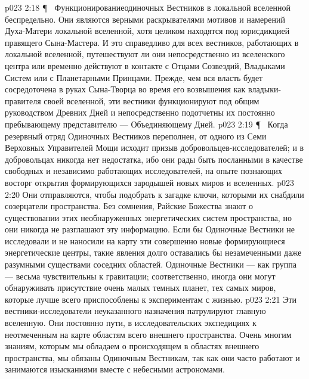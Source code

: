 \vs p023 2:18 \P\ \bibnobreakspace {} Функционированиеодиночных Вестников в локальной вселенной беспредельно. Они являются верными раскрывателями мотивов и намерений Духа\hyp{}Матери локальной вселенной, хотя целиком находятся под юрисдикцией правящего Сына\hyp{}Мастера. И это справедливо для всех вестников, работающих в локальной вселенной, путешествуют ли они непосредственно из вселенского центра или временно действуют в контакте с Отцами Созвездий, Владыками Систем или с Планетарными Принцами. Прежде, чем вся власть будет сосредоточена в руках Сына\hyp{}Творца во время его возвышения как владыки\hyp{}правителя своей вселенной, эти вестники функционируют под общим руководством Древних Дней и непосредственно подотчетны их постоянно пребывающему представителю --- Объединяющему Дней.
\vs p023 2:19 \P\ \bibnobreakspace {} Когда резервный отряд Одиночных Вестников переполнен, от одного из Семи Верховных Управителей Мощи исходит призыв добровольцев\hyp{}исследователей; и в добровольцах никогда нет недостатка, ибо они рады быть посланными в качестве свободных и независимо работающих исследователей, на опыте познающих восторг открытия формирующихся зародышей новых миров и вселенных.
\vs p023 2:20 Они отправляются, чтобы подобрать к загадке ключи, которыми их снабдили созерцатели пространства. Без сомнения, Райские Божества знают о существовании этих необнаруженных энергетических систем пространства, но они никогда не разглашают эту информацию. Если бы Одиночные Вестники не исследовали и не наносили на карту эти совершенно новые формирующиеся энергетические центры, такие явления долго оставались бы незамеченными даже разумными существами соседних областей. Одиночные Вестники --- как группа --- весьма чувствительны к гравитации; соответственно, иногда они могут обнаруживать присутствие очень малых темных планет, тех самых миров, которые лучше всего приспособлены к экспериментам с жизнью.
\vs p023 2:21 Эти вестники\hyp{}исследователи неуказанного назначения патрулируют главную вселенную. Они постоянно пути, в исследовательских экспедициях к неотмеченным на карте областям всего внешнего пространства. Очень многим знаниям, которым мы обладаем о происходящем в областях внешнего пространства, мы обязаны Одиночным Вестникам, так как они часто работают и занимаются изысканиями вместе с небесными астрономами.
